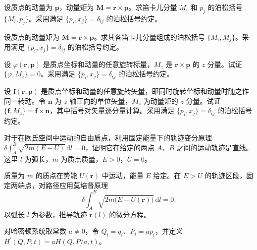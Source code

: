 \noindent\begin{minipage}{\textwidth}
设质点的动量为 $\mathbf p$，动量矩为 $\mathbf M=\mathbf r\times\mathbf p$。求笛卡儿分量 $M_i$ 和 $p_j$ 的泊松括号 $\{M_i,p_j\}$。采用满足 $\{p_i,x_j\}=\delta_{ij}$ 的泊松括号约定。
\end{minipage}\par\vfill
\newpage
\noindent\begin{minipage}{\textwidth}
设质点的动量矩为 $\mathbf M=\mathbf r\times\mathbf p$。求其各笛卡儿分量组成的泊松括号 $\{M_i,M_j\}$。采用满足 $\{p_i,x_j\}=\delta_{ij}$ 的泊松括号约定。
\end{minipage}\par\vfill
\noindent\begin{minipage}{\textwidth}
设 $\varphi(\mathbf r,\mathbf p)$ 是质点坐标和动量的任意旋转标量，$M_z$ 是 $\mathbf r\times\mathbf p$ 的 $z$ 分量。试证 $\{\varphi,M_z\}=0$。采用满足 $\{p_i,x_j\}=\delta_{ij}$ 的泊松括号约定。
\end{minipage}\par\vfill
\newpage
\noindent\begin{minipage}{\textwidth}
设 $\mathbf f(\mathbf r,\mathbf p)$ 是质点坐标和动量的任意旋转矢量，即同时旋转坐标和动量时随之作同一转动。令 $\mathbf n$ 为 $z$ 轴正向的单位矢量，$M_z$ 为动量矩的 $z$ 分量。试证 $\{\mathbf f,M_z\}=\mathbf f\times\mathbf n$，其中括号对矢量逐分量计算。采用满足 $\{p_i,x_j\}=\delta_{ij}$ 的泊松括号约定。
\end{minipage}\par\vfill
\noindent\begin{minipage}{\textwidth}
对于在欧氏空间中运动的自由质点，利用固定能量下的轨迹变分原理 $\delta\int_A^B\sqrt{2m(E-U)}\,\mathrm dl=0$，证明它在给定的两点 $A$、$B$ 之间的运动轨迹是直线。这里 $l$ 为弧长，$m$ 为质点质量，$E>0$，$U=0$。
\end{minipage}\par\vfill
\newpage
\noindent\begin{minipage}{\textwidth}
质量为 $m$ 的质点在势能 $U(\mathbf r)$ 中运动，能量 $E$ 给定。在 $E>U$ 的轨迹区段，固定两端点，对路径应用莫培督原理
\[
\delta\int_A^B\sqrt{2m\bigl(E-U(\mathbf r)\bigr)}\,\mathrm dl=0.
\]
以弧长 $l$ 为参数，推导轨迹 $\mathbf r(l)$ 的微分方程。
\end{minipage}\par\vfill
\noindent\begin{minipage}{\textwidth}
对哈密顿系统取常数 $a\ne0$，令 $Q_i=q_i$、$P_i=ap_i$，并定义 $H^\prime(Q,P,t)=aH(Q,P/a,t)$。
\end{minipage}\par\vfill
